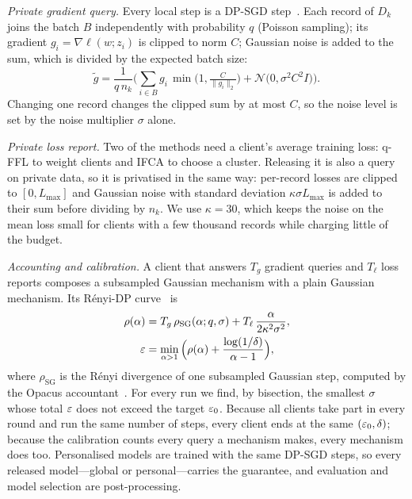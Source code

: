 \emph{Private gradient query.} Every local step is a DP-SGD step~\cite{abadi2016deep}. Each record of $D_k$ joins the
batch $B$ independently with probability $q$ (Poisson sampling); its gradient $g_i=\nabla\ell(w;z_i)$ is clipped to
norm $C$; Gaussian noise is added to the sum, which is divided by the expected batch size:
\begin{equation}
\tilde g=\frac{1}{q\,n_k}\Big(\sum_{i\in B} g_i\,\min\!\big(1,\tfrac{C}{\lVert g_i\rVert_2}\big)+\mathcal N\!\big(0,\sigma^2C^2 I\big)\Big).
\label{eq:dpsgd}
\end{equation}
Changing one record changes the clipped sum by at most $C$, so the noise level is set by the noise multiplier
$\sigma$ alone.

\emph{Private loss report.} Two of the methods need a client's average training loss: q-FFL to weight clients and
IFCA to choose a cluster. Releasing it is also a query on private data, so it is privatised in the same way: per-record
losses are clipped to $[0,L_{\max}]$ and Gaussian noise with standard deviation $\kappa\sigma L_{\max}$ is added to
their sum before dividing by $n_k$. We use $\kappa=30$, which keeps the noise on the mean loss small for clients with
a few thousand records while charging little of the budget.

\emph{Accounting and calibration.} A client that answers $T_g$ gradient queries and $T_\ell$ loss reports composes a
subsampled Gaussian mechanism with a plain Gaussian mechanism. Its R\'enyi-DP curve~\cite{mironov2017renyi} is
\begin{align}
\rho(\alpha)&=T_g\,\rho_{\mathrm{SG}}(\alpha;q,\sigma)+T_\ell\,\frac{\alpha}{2\kappa^2\sigma^2}, \nonumber\\
\varepsilon&=\min_{\alpha>1}\Big(\rho(\alpha)+\frac{\log(1/\delta)}{\alpha-1}\Big),
\label{eq:accounting}
\end{align}
where $\rho_{\mathrm{SG}}$ is the R\'enyi divergence of one subsampled Gaussian step, computed by the Opacus
accountant~\cite{yousefpour2021opacus}. For every run we find, by bisection, the smallest $\sigma$ whose total
$\varepsilon$ does not exceed the target $\varepsilon_0$. Because all clients take part in every round and run the same number of
steps, every client ends at the same $(\varepsilon_0,\delta)$; because the calibration counts every query a mechanism makes,
every mechanism does too. Personalised models are trained with the same DP-SGD steps, so every released model---global
or personal---carries the guarantee, and evaluation and model selection are post-processing.

